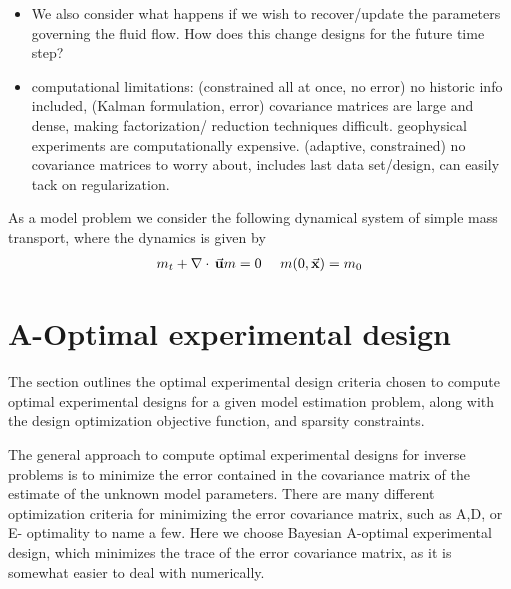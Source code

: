 \documentclass[12pt]{article}
\newcommand {\vu}  	 {{\vec {\bf  u}} }   %
\newcommand {\vx}    {\vec {\bf x}}
\renewcommand{\div}	{\nabla\cdot\,}
\begin{document}
\begin{itemize}

\item We also consider what happens if we wish to recover/update the parameters governing the fluid flow. How does this change designs for the future time step? 


\item computational limitations: (constrained all at once, no error) no historic info included, (Kalman formulation, error) covariance matrices are large and dense, making factorization/ reduction techniques difficult. geophysical experiments are computationally expensive. (adaptive, constrained)
no covariance matrices to worry about, includes last data set/design, can easily tack on regularization.
\end{itemize}

As a model problem we consider the following dynamical system of simple mass transport, where the
dynamics is given by
\begin{eqnarray}
\label{dynamics}
m_{t} + \div {\vu} m = 0\ \quad m(0,\vx) = m_{0}
\end{eqnarray} 


\section{A-Optimal experimental design } 
The section outlines the optimal experimental design criteria chosen to compute optimal experimental designs for a given model estimation problem, along with the design optimization objective function, and sparsity constraints.

The general approach to compute optimal experimental designs for inverse problems is to minimize the error contained in the covariance matrix of the estimate of the unknown model parameters.  There are many different optimization criteria for minimizing the error covariance matrix, such as A,D, or E- optimality to name a few. Here we choose Bayesian A-optimal experimental design, which minimizes the trace of the error covariance matrix, as it is somewhat easier to deal with numerically.   
\bigskip
\end{document}
